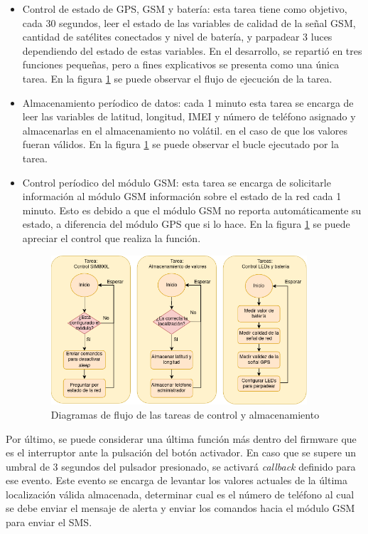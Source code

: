 \begin{itemize}
		\item Control de estado de GPS, GSM y batería: esta tarea tiene como objetivo, cada 30 segundos, leer el estado de las variables de calidad de la señal GSM, cantidad de satélites conectados y nivel de batería, y parpadear 3 luces dependiendo del estado de estas variables. En el desarrollo, se repartió en tres funciones pequeñas, pero a fines explicativos se presenta como una única tarea. En la figura \ref{fig:esp32:tasks3} se puede observar el flujo de ejecución de la tarea.
		\item Almacenamiento períodico de datos: cada 1 minuto esta tarea se encarga de leer las variables de latitud, longitud, IMEI y número de teléfono asignado y almacenarlas en el almacenamiento no volátil. en el caso de que los valores fueran válidos. En la figura \ref{fig:esp32:tasks3} se puede observar el bucle ejecutado por la tarea.
		\item Control períodico del módulo GSM: esta tarea se encarga de solicitarle información al módulo GSM información sobre el estado de la red cada 1 minuto. Esto es debido a que el módulo GSM no reporta automáticamente su estado, a diferencia del módulo GPS que si lo hace.  En la figura \ref{fig:esp32:tasks3} se puede apreciar el control que realiza la función.
		
	\begin{figure}[H]
		\centering
		\includegraphics[width=0.9\textwidth]{./Figures/esp32-tasks3.png}
		\caption{Diagramas de flujo de las tareas de control y almacenamiento}
		\label{fig:esp32:tasks3}
	\end{figure}

\end{itemize}

Por último, se puede considerar una última función más dentro del firmware que es el interruptor ante la pulsación del botón activador. En caso que se supere un umbral de 3 segundos del pulsador presionado, se activará \textit{callback} definido para ese evento. Este evento se encarga de levantar los valores actuales de la última localización válida almacenada, determinar cual es el número de teléfono al cual se debe enviar el mensaje de alerta y enviar los comandos hacia el módulo GSM para enviar el SMS. 

